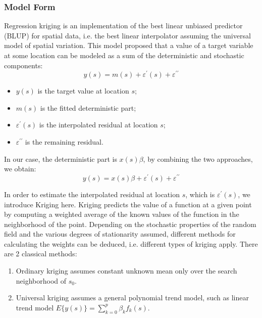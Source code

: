 \documentclass{article}
\begin{document}
\subsubsection{Model Form}
Regression kriging is an implementation of the best linear unbiased predictor (BLUP) for spatial data, i.e. the best linear interpolator assuming the universal model of spatial variation. This model proposed that a value of a target variable at some location can be modeled as a sum of the deterministic and stochastic components:
\begin{equation}
    y( s )=m( s )+\varepsilon^{\prime}( s )+\varepsilon^{\prime \prime}
\end{equation}
\begin{itemize}
    \item ${y}\left( s\right)$ is the target value at location $s$;
    \item ${m}\left( s\right)$ is the fitted deterministic part;
    \item $\varepsilon^{\prime}( s )$ is the interpolated residual at location $s$;
    \item $\varepsilon^{\prime \prime} $ is the remaining residual.
\end{itemize}
In our case, the deterministic part is $x( s )\beta$, by combining the two approaches, we obtain:
\begin{equation}
    y( s )=x( s )\beta+\varepsilon^{\prime}( s )+\varepsilon^{\prime \prime}
\end{equation}

In order to estimate the interpolated residual at location $s$, which is $\varepsilon^{\prime}( s )$, we introduce Kriging here.
Kriging predicts the value of a function at a given point by computing a weighted average of the known values of the function in the neighborhood of the point. Depending on the stochastic properties of the random field and the various degrees of stationarity assumed, different methods for calculating the weights can be deduced, i.e. different types of
kriging apply. There are 2 classical methods:
\begin{enumerate}
    \item Ordinary kriging assumes constant unknown mean only over the search neighborhood of $s_{0}$.
    \item Universal kriging assumes a general polynomial trend model, such as linear trend model $E\{y(s)\}=\sum_{k=0}^{p} \beta_{k} f_{k}(s)$.
\end{enumerate}
\end{document}
